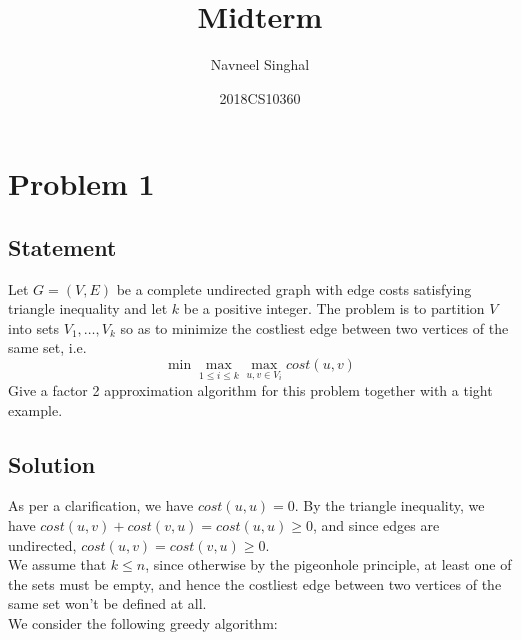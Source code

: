 \documentclass[a4paper]{article}
\title{\textbf{Midterm}}
\author{Navneel Singhal}
\date{2018CS10360}
\newcommand{\nl}{\vspace{0.2cm}\\}
\begin{document}
\maketitle
\tableofcontents


\newpage

\section{Problem 1}

\subsection{Statement}

Let $G = (V, E)$ be a complete undirected graph with edge costs satisfying triangle inequality and let $k$ be a positive integer. The problem is to partition $V$ into sets $V_1,\ldots, V_k$ so as to minimize the costliest edge between two vertices of the same set, i.e.
$$
\min \max_{1 \le i \le k} \max_{u,v \in V_i} cost(u, v)
$$
Give a factor 2 approximation algorithm for this problem together with a tight example.

\subsection{Solution}

As per a clarification, we have $cost(u, u) = 0$. By the triangle inequality, we have $cost(u, v) + cost(v, u) = cost(u, u) \ge 0$, and since edges are
undirected, $cost(u, v) = cost(v, u) \ge 0$.\nl
We assume that $k \le n$, since otherwise by the pigeonhole principle, at least one of the sets must be empty, and hence the costliest edge between two vertices of the same set won't be defined at
all.\nl
We consider the following greedy algorithm:
\end{document}
